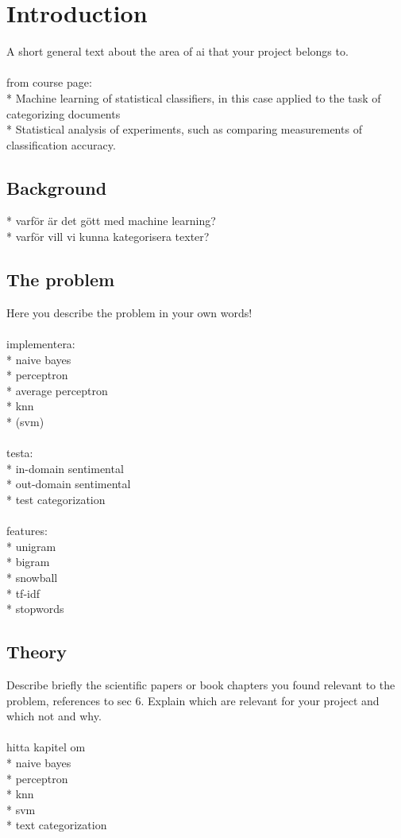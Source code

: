 \chapter{Introduction}
A short general text about the area of ai that your project belongs to.
\\\\
from course page:\\
* Machine learning of statistical classifiers, in this case applied to the task of categorizing documents\\
* Statistical analysis of experiments, such as comparing measurements of classification accuracy.

\section{Background}
* varför är det gött med machine learning? \\
* varför vill vi kunna kategorisera texter?

\section{The problem}
Here you describe the problem in your own words!
\\\\
implementera:\\
* naive bayes\\
* perceptron\\
* average perceptron\\
* knn\\
* (svm)
\\\\
testa:\\
* in-domain sentimental\\
* out-domain sentimental\\
* test categorization
\\\\
features:\\
* unigram\\
* bigram\\
* snowball\\
* tf-idf\\
* stopwords

\section{Theory}
Describe briefly the scientific papers or book chapters you found relevant to the problem, references to sec 6. Explain which are relevant for your project and which not and why.
\\\\
hitta kapitel om\\
* naive bayes\\
* perceptron\\
* knn\\
* svm \\
* text categorization

